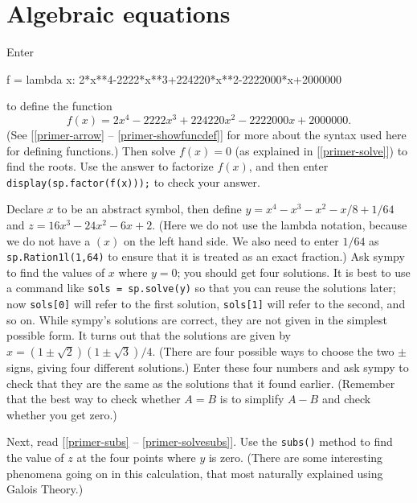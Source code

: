 \documentclass[a4paper,10pt]{amsbook}
\begin{document}
\section{Algebraic equations}

\begin{exercise}\label{ex-decimal-roots}
 Enter
\begin{pcodeblock}
 f = lambda x: 2*x**4-2222*x**3+224220*x**2-2222000*x+2000000
\end{pcodeblock}
 to define the function
 \[ f(x) = 2x^4-2222x^3+224220x^2-2222000x+2000000. \]
 (See [\ref{primer-arrow} -- \ref{primer-showfuncdef}] for more about
 the syntax used here for defining functions.) Then solve 
 $f(x)=0$ (as explained in [\ref{primer-solve}])
 to find the roots.  Use the answer to factorize $f(x)$, and then
 enter \verb~display(sp.factor(f(x)));~ to check your answer.
\end{exercise}

\begin{exercise}\label{ex-biquadratic-roots}
 Declare $x$ to be an abstract symbol, then define
 $y=x^4-x^3-x^2-x/8+1/64$ and $z=16x^3-24x^2-6x+2$.  (Here we do not
 use the lambda notation, because we do not have a $(x)$ on the left
 hand side.  We also need to enter $1/64$ as \verb~sp.Ration1l(1,64)~
 to ensure that it is treated as an exact fraction.)  Ask sympy to
 find the values of $x$ where $y=0$; you should get four solutions.
 It is best to use a command like \verb~sols = sp.solve(y)~ so that
 you can reuse the solutions later; now \verb~sols[0]~ will refer to
 the first solution, \verb~sols[1]~ will refer to the second, and so
 on.  While sympy's solutions are correct, they are not given in the
 simplest possible form.  It turns out that the solutions are given by
 $x=(1\pm\sqrt{2})(1\pm\sqrt{3})/4$.  (There are four possible ways to
 choose the two $\pm$ signs, giving four different solutions.)  Enter
 these four numbers and ask sympy to check that they are the same as
 the solutions that it found earlier.  (Remember that the best way to
 check whether $A=B$ is to simplify $A-B$ and check whether you get
 zero.)

 Next, read [\ref{primer-subs} -- \ref{primer-solvesubs}].  Use the \verb~subs()~
 method to find the value of $z$ at the four points where $y$ is
 zero.  (There are some interesting phenomena going on in this
 calculation, that most naturally explained using Galois Theory.)
\end{exercise}
\end{document}
